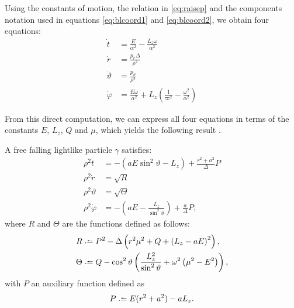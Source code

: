 Using the constants of motion, the relation in \autoref{eq:raisep} and the components notation used in equations \ref{eq:blcoord1} and  \ref{eq:blcoord2}, we obtain four equations:
\begin{align}
	\label{eq:initt}
	\dot{t} &= \frac{E}{\alpha^2} - \frac{L_z \omega}{\alpha^2} \\
	\label{eq:initr}
	\dot{r} &= \frac{p_r \Delta}{\rho^2} \\
	\label{eq:inittheta}
	\dot{\vartheta} &= \frac{p_\vartheta}{\rho^2} \\
	\label{eq:initphi}
	\dot{\varphi} &= \frac{E \omega}{\alpha^2} + L_z\left( \frac{1}{\varpi^2} - \frac{\omega^2}{\alpha^2} \right)
\end{align}

From this direct computation, we can express all four equations in terms of the constants $E$, $L_z$, $Q$ and $\mu$, which yields the following result \cite[p. 899]{thorne73}.

\begin{theorem}
	\label{theo:firsteqs}
	A free falling lightlike particle $\gamma$ satisfies:
	\begin{align}
		\label{eq:teq}
		\rho^2 \dot{t} &=-( aE\sin^2\vartheta - L_z) + \frac{r^2+a^2}{\Delta}P \\
		\label{eq:req}
		\rho^2 \dot{r} &= \sqrt{R} \\
		\label{eq:thetaeq}
		\rho^2 \dot{\vartheta} &= \sqrt{\Theta} \\
		\label{eq:phieq}
		\rho^2 \dot{\varphi} &=-( aE - \frac{L_z}{\sin^2\vartheta}) + \frac{a}{\Delta}P,
	\end{align}
	where $R$ and $\Theta$ are the functions defined as follows:
	\begin{align}
		\label{eq:defR}
		R &\defeq P^2 - \Delta \left( r^2\mu^2 + Q + \left(L_z - aE \right)^2 \right), \\
		\label{eq:defTheta}
		\Theta &\defeq Q - \cos^2\vartheta \left( \frac{L_z^2}{\sin^2\vartheta} + \omega^2\left(\mu^2 - E^2 \right)\right),
	\end{align}
	with $P$ an auxiliary function defined as
	\begin{equation}
		\label{eq:defP}
		P \defeq E(r^2 + a^2) - aL_z.
	\end{equation}
\end{theorem}

